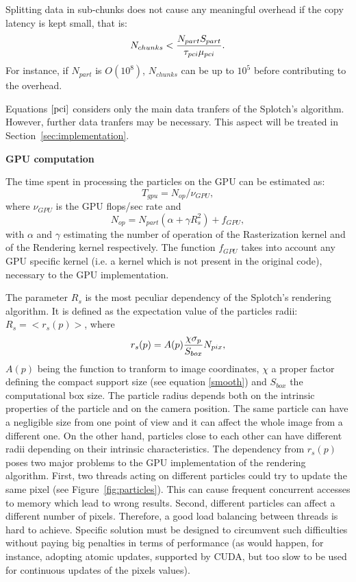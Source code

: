 \documentclass[11pt]{article}
\begin{document}
Splitting data in sub-chunks does not
cause any meaningful overhead if the copy latency is kept small, that is:
\begin{equation}
N_{chunks} < {N_{part} S_{part}\over \tau_{pci}\mu_{pci}}.
\end{equation}
For instance, if $N_{part}$ is $O(10^8)$, $N_{chunks}$ can be up to $10^5$ before
contributing to the overhead.

Equations $\eqref{pci}$ considers only the main data tranfers of
the Splotch's algorithm. However, further data tranfers may be necessary.
This aspect will be treated in Section~\ref{sec:implementation}.

\medskip
\noindent
{\bf GPU computation}

\noindent
The time spent in processing the particles on the GPU can be estimated as:
\begin{equation}
T_{gpu} = N_{op}/\nu_{GPU},
\end{equation}
where $\nu_{GPU}$ is the GPU flops/sec rate and
\begin{equation}\label{ops}
N_{op} = N_{part}(\alpha + \gamma R_s^2) + f_{GPU},
\end{equation}
with $\alpha$ and $\gamma$ estimating the number of operation of 
the Rasterization kernel  
and of the Rendering kernel respectively. The function 
$f_{GPU}$ takes into account any GPU specific kernel (i.e. a kernel
which is not present in the original code), necessary to the GPU implementation. 

The parameter $R_s$ is the most peculiar dependency of the Splotch's rendering
algorithm. It is defined as the expectation value of the particles radii:
$R_s = <r_s(p)>$, where
\begin{equation}\label{radius}
r_s(p) = A(p){\chi \sigma_p\over S_{box}} N_{pix},
\end{equation} 
$A(p)$ being the function to tranform to image coordinates,
$\chi$ a proper factor defining the compact support size (see  
equation \eqref{smooth}) and $S_{box}$ the computational box size.
The particle radius depends both on the intrinsic properties of the particle
and on the camera position. The same particle can have a negligible size
from one point of view and it can affect the whole image from a different one.
On the other hand, particles close to each other can have different radii depending
on their intrinsic characteristics. The dependency from $r_s(p)$ poses 
two major problems to the GPU implementation of the rendering 
algorithm. First, two threads acting on different particles could try 
to update the same pixel (see Figure~\ref{fig:particles}).
This can cause frequent concurrent accesses to memory
which lead to wrong results. 
Second, different particles can affect a different number of pixels. Therefore, a good load balancing
between threads is hard to achieve.  
Specific solution must be designed to circumvent such difficulties 
without paying big penalties in terms of performance (as would happen, for instance,
adopting atomic updates, supported by CUDA, but too slow to be used for continuous 
updates of the pixels values).
\end{document}
